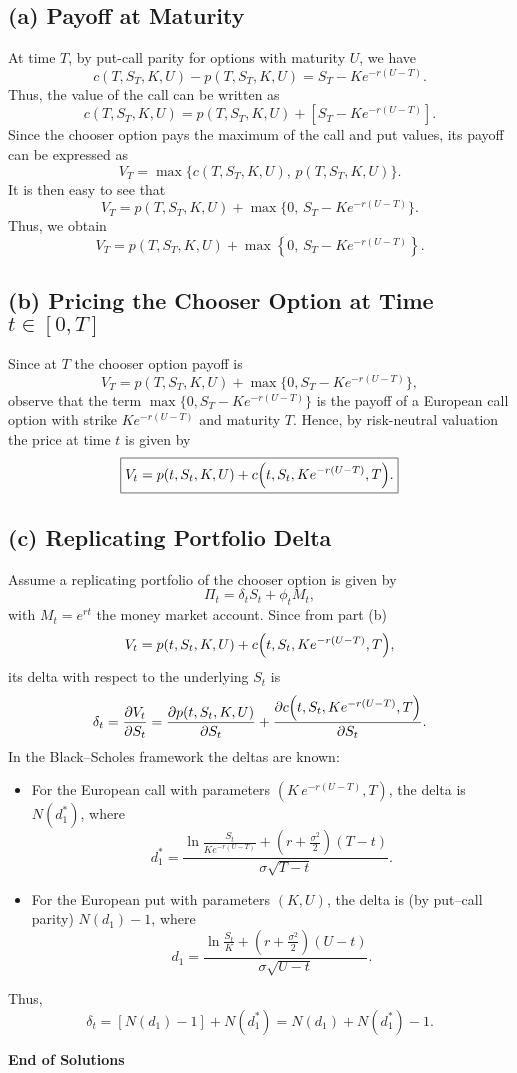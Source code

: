 \documentclass[12pt]{article}
\begin{document}
\subsection*{(a) Payoff at Maturity}

At time \(T\), by put-call parity for options with maturity \(U\), we have
\[
c(T,S_T,K,U) - p(T,S_T,K,U) = S_T - Ke^{-r(U-T)}.
\]
Thus, the value of the call can be written as
\[
c(T,S_T,K,U) = p(T,S_T,K,U) + \left[S_T - Ke^{-r(U-T)}\right].
\]
Since the chooser option pays the maximum of the call and put values, its payoff can be expressed as
\[
V_T = \max\{ c(T,S_T,K,U),\, p(T,S_T,K,U) \}.
\]
It is then easy to see that
\[
V_T = p(T,S_T,K,U) + \max\{0,\, S_T - Ke^{-r(U-T)}\}.
\]
Thus, we obtain
\[
\boxed{V_T = p(T,S_T,K,U) + \max\left\{0,\, S_T - Ke^{-r(U-T)}\right\}.}
\]

\subsection*{(b) Pricing the Chooser Option at Time \(t \in [0,T]\)}

Since at \(T\) the chooser option payoff is
\[
V_T = p(T,S_T,K,U) + \max\{0, S_T - Ke^{-r(U-T)}\},
\]
observe that the term \(\max\{0, S_T - Ke^{-r(U-T)}\}\) is the payoff of a European call option with strike \(Ke^{-r(U-T)}\) and maturity \(T\). Hence, by risk-neutral valuation the price at time \(t\) is given by
\[
\boxed{V_t = p(t,S_t,K,U) + c\Bigl(t,S_t,Ke^{-r(U-T)},T\Bigr).}
\]

\subsection*{(c) Replicating Portfolio Delta}

Assume a replicating portfolio of the chooser option is given by
\[
\Pi_t = \delta_t S_t + \phi_t M_t,
\]
with \(M_t = e^{rt}\) the money market account. Since from part (b)
\[
V_t = p(t,S_t,K,U) + c\Bigl(t,S_t,Ke^{-r(U-T)},T\Bigr),
\]
its delta with respect to the underlying \(S_t\) is
\[
\delta_t = \frac{\partial V_t}{\partial S_t} = \frac{\partial p(t,S_t,K,U)}{\partial S_t} + \frac{\partial c\Bigl(t,S_t,Ke^{-r(U-T)},T\Bigr)}{\partial S_t}.
\]
In the Black--Scholes framework the deltas are known:
\begin{itemize}[leftmargin=1cm]
    \item For the European call with parameters \((K\,e^{-r(U-T)},T)\), the delta is \(N(d_1^*)\), where
    \[
    d_1^* = \frac{\ln\frac{S_t}{Ke^{-r(U-T)}}+\left(r+\frac{\sigma^2}{2}\right)(T-t)}{\sigma\sqrt{T-t}}.
    \]
    \item For the European put with parameters \((K,U)\), the delta is (by put--call parity) \(N(d_1) - 1\), where
    \[
    d_1 = \frac{\ln\frac{S_t}{K}+\left(r+\frac{\sigma^2}{2}\right)(U-t)}{\sigma\sqrt{U-t}}.
    \]
\end{itemize}
Thus,
\[
\boxed{\delta_t = \left[N(d_1) - 1\right] + N(d_1^*) = N(d_1) + N(d_1^*) - 1.}
\]

\begin{center}
    \textbf{\large End of Solutions}
\end{center}
\end{document}
